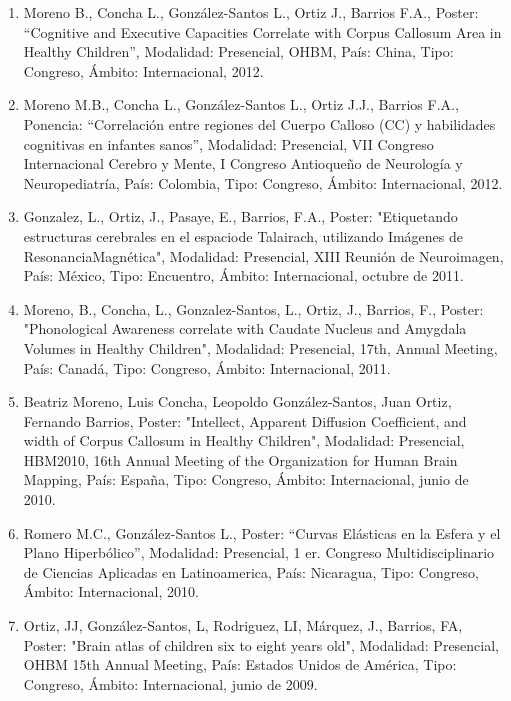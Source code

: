 \documentclass[12pt]{article}
\begin{document}
\begin{enumerate}
\item Moreno B., Concha L., González-Santos L., Ortiz J., Barrios F.A., Poster: “Cognitive and Executive Capacities Correlate with 
Corpus 
Callosum Area in Healthy Children”, Modalidad: Presencial, OHBM, País: China, Tipo: Congreso, Ámbito: Internacional, 2012.

\item Moreno M.B., Concha L., González-Santos L., Ortiz J.J., Barrios F.A., Ponencia: “Correlación entre regiones del Cuerpo Calloso 
(CC) 
y habilidades cognitivas en infantes sanos”, Modalidad: Presencial, VII Congreso Internacional Cerebro y Mente, I Congreso Antioqueño 
de Neurología y Neuropediatría, País: Colombia, Tipo: Congreso, Ámbito: Internacional, 2012.

\item Gonzalez, L., Ortiz, J., Pasaye, E., Barrios, F.A., Poster: "Etiquetando estructuras cerebrales en el espaciode Talairach, 
utilizando Imágenes de ResonanciaMagnética", Modalidad: Presencial, XIII Reunión de Neuroimagen, País: México, Tipo: Encuentro, Ámbito: 
Internacional, octubre de 2011.

\item Moreno, B., Concha, L., Gonzalez-Santos, L., Ortiz, J., Barrios, F., Poster: "Phonological Awareness correlate with Caudate 
Nucleus 
and Amygdala Volumes in Healthy Children", Modalidad: Presencial, 17th, Annual Meeting, País: Canadá, Tipo: Congreso, Ámbito: 
Internacional, 2011.

\item Beatriz Moreno, Luis Concha, Leopoldo González-Santos, Juan Ortiz, Fernando Barrios, Poster: "Intellect, Apparent Diffusion 
Coefficient, and width of Corpus Callosum in Healthy Children", Modalidad: Presencial, HBM2010, 16th Annual Meeting of the Organization 
for Human Brain Mapping, País: España, Tipo: Congreso, Ámbito: Internacional, junio de 2010.

\item Romero M.C., González-Santos L., Poster: “Curvas Elásticas en la Esfera y el Plano Hiperbólico”, Modalidad: Presencial, 1 er. 
Congreso Multidisciplinario de Ciencias Aplicadas en Latinoamerica, País: Nicaragua, Tipo: Congreso, Ámbito: Internacional, 2010.

\item Ortiz, JJ, González-Santos, L, Rodriguez, LI, Márquez, J., Barrios, FA, Poster: "Brain atlas of children six to eight years old", 
Modalidad: Presencial, OHBM 15th Annual Meeting, País: Estados Unidos de América, Tipo: Congreso, Ámbito: Internacional, junio de 2009.


\end{enumerate}
\end{document}

